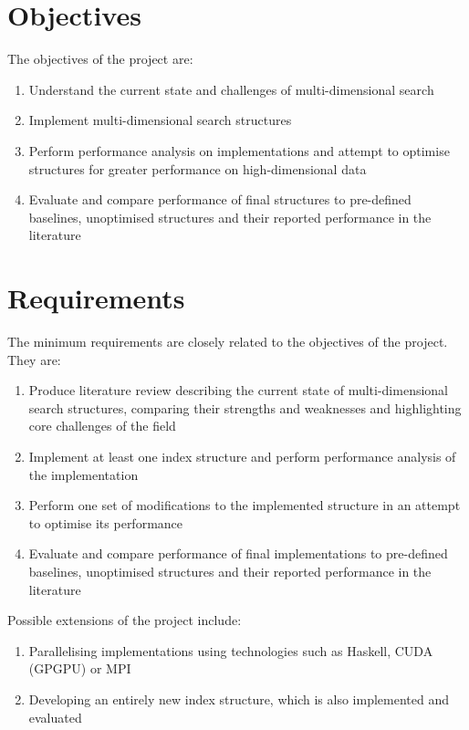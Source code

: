 \section{Objectives}
\label{sec:objectives}

The objectives of the project are:
\begin{enumerate}
	\item Understand the current state and challenges of multi-dimensional search
	\item Implement multi-dimensional search structures
	\item Perform performance analysis on implementations and attempt to optimise structures for greater performance on high-dimensional data
	\item Evaluate and compare performance of final structures to pre-defined baselines, unoptimised structures and their reported performance in the literature
\end{enumerate}

\section{Requirements}
\label{sec:requirements}

The minimum requirements are closely related to the objectives of the project. They are:
\begin{enumerate}
	\item Produce literature review describing the current state of multi-dimensional search structures, comparing their strengths and weaknesses and highlighting core challenges of the field
	\item Implement at least one index structure and perform performance analysis of the implementation
	\item Perform one set of modifications to the implemented structure in an attempt to optimise its performance
	\item Evaluate and compare performance of final implementations to pre-defined baselines, unoptimised structures and their reported performance in the literature
\end{enumerate}

Possible extensions of the project include:
\begin{enumerate}
	\item Parallelising implementations using technologies such as Haskell, CUDA (GPGPU) or MPI
	\item Developing an entirely new index structure, which is also implemented and evaluated
\end{enumerate}

